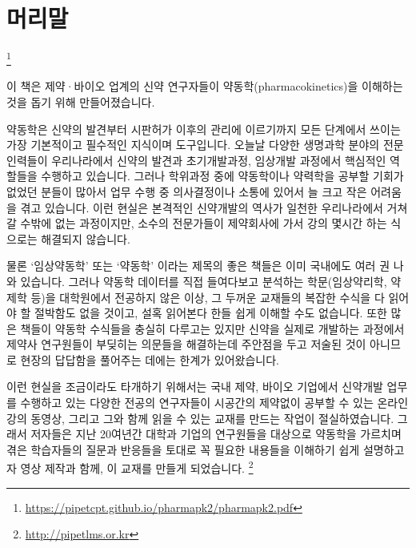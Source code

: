 \documentclass[
  11pt,
  krantz2, a4paper, twoside]{krantz}
\renewcommand{\href}[2]{#2\footnote{\url{#1}}}
\begin{document}
\setlength{\abovedisplayskip}{-5pt}
\setlength{\abovedisplayshortskip}{-5pt}

\newpage\thispagestyle{empty}\null

{
\hypersetup{linkcolor=}
\setcounter{tocdepth}{2}
\tableofcontents
}
\chapter*{머리말}\label{uxba38uxb9acuxb9d0}


\href{https://pipetcpt.github.io/pharmapk2/pharmapk2.pdf}{}

\normalsize

이 책은 제약·바이오 업계의 신약 연구자들이 약동학(pharmacokinetics)을 이해하는 것을 돕기 위해 만들어졌습니다.

  
약동학은 신약의 발견부터 시판허가 이후의 관리에 이르기까지 모든 단계에서 쓰이는 가장 기본적이고 필수적인 지식이며 도구입니다.
오늘날 다양한 생명과학 분야의 전문인력들이 우리나라에서 신약의 발견과 초기개발과정, 임상개발 과정에서 핵심적인 역할들을 수행하고 있습니다.
그러나 학위과정 중에 약동학이나 약력학을 공부할 기회가 없었던 분들이 많아서 업무 수행 중 의사결정이나 소통에 있어서 늘 크고 작은 어려움을 겪고 있습니다.
이런 현실은 본격적인 신약개발의 역사가 일천한 우리나라에서 거쳐갈 수밖에 없는 과정이지만, 소수의 전문가들이 제약회사에 가서 강의 몇시간 하는 식으로는 해결되지 않습니다.

물론 `임상약동학' 또는 `약동학' 이라는 제목의 좋은 책들은 이미 국내에도
여러 권 나와 있습니다. 그러나 약동학 데이터를 직접 들여다보고 분석하는
학문(임상약리학, 약제학 등)을 대학원에서 전공하지 않은 이상, 그 두꺼운 교재들의 복잡한 수식을 다 읽어야 할 절박함도 없을 것이고, 설혹 읽어본다
한들 쉽게 이해할 수도 없습니다.
또한 많은 책들이 약동학 수식들을 충실히
다루고는 있지만 신약을 실제로 개발하는 과정에서 제약사 연구원들이 부딪히는 의문들을 해결하는데 주안점을 두고 저술된 것이 아니므로 현장의 답답함을 풀어주는 데에는 한계가 있어왔습니다.

이런 현실을 조금이라도 타개하기 위해서는 국내 제약, 바이오 기업에서 신약개발 업무를 수행하고 있는 다양한 전공의 연구자들이 시공간의 제약없이 공부할 수 있는 온라인 강의 동영상, 그리고 그와 함께 읽을 수 있는 교재를 만드는 작업이 절실하였습니다.
그래서 저자들은 지난 20여년간 대학과 기업의 연구원들을 대상으로 약동학을 가르치며 겪은 학습자들의 질문과 반응들을 토대로 꼭 필요한 내용들을 이해하기 쉽게 설명하고자 영상 제작과 함께, 이 교재를 만들게 되었습니다. \footnote{\url{http://pipetlms.or.kr}}
\end{document}
